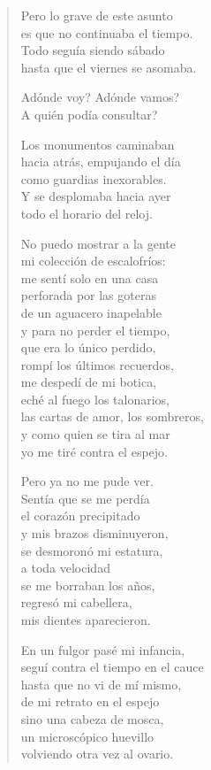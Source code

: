 \documentclass[12pt]{article}
\begin{document}
\begin{verse}
Pero lo grave de este asunto\\
es que no continuaba el tiempo.\\
Todo seguía siendo sábado\\
hasta que el viernes se asomaba.  

Adónde voy? Adónde vamos?\\
A quién podía consultar?  

Los monumentos caminaban\\
hacia atrás, empujando el día\\
como guardias inexorables.\\
Y se desplomaba hacia ayer\\
todo el horario del reloj.  

No puedo mostrar a la gente\\
mi colección de escalofríos:\\
me sentí solo en una casa\\
perforada por las goteras\\
de un aguacero inapelable\\
y para no perder el tiempo,\\
que era lo único perdido,\\
rompí los últimos recuerdos,\\
me despedí de mi botica,\\
eché al fuego los talonarios,\\
las cartas de amor, los sombreros,\\
y como quien se tira al mar\\
yo me tiré contra el espejo.  

Pero ya no me pude ver.\\
Sentía que se me perdía\\
el corazón precipitado\\
y mis brazos disminuyeron,\\
se desmoronó mi estatura,\\
a toda velocidad\\
se me borraban los años,\\
regresó mi cabellera,\\
mis dientes aparecieron.  

En un fulgor pasé mi infancia,\\
seguí contra el tiempo en el cauce\\
hasta que no vi de mí mismo,\\
de mi retrato en el espejo\\
sino una cabeza de mosca,\\
un microscópico huevillo\\
volviendo otra vez al ovario.  

\end{verse}
\end{document}

